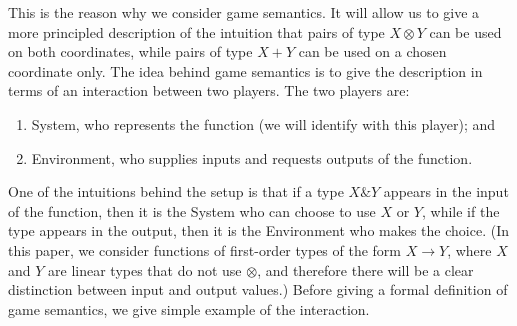 \documentclass[10pt,a4paper]{amsart}
\numberwithin{equation}{section}
\theoremstyle{plain}
\begin{document}
This is the reason why we consider game semantics. It will allow us to give  a more principled description of the intuition that pairs of type $X \otimes Y$ can be used on both coordinates, while pairs of type $X + Y$ can be used on a chosen coordinate only. The idea behind game semantics is to give the description in terms of an interaction between two players.  The two players are:
\begin{enumerate}
    \item System, who represents the function (we will identify with this player); and
    \item Environment, who supplies inputs and requests outputs of the function.
\end{enumerate}
One of the intuitions behind the setup is that if a type $X \& Y$ appears in the input of the function, then it is the System who can choose to use $X$ or $Y$, while if the type appears in the output, then it is the Environment who makes the choice. (In this paper, we consider functions of first-order types of the form $X \to Y$, where $X$ and $Y$ are linear types that do not use $\otimes$, and therefore there will be a clear distinction between input and output values.)
Before giving a formal definition of game semantics, we give simple example of the interaction.
\end{document}
